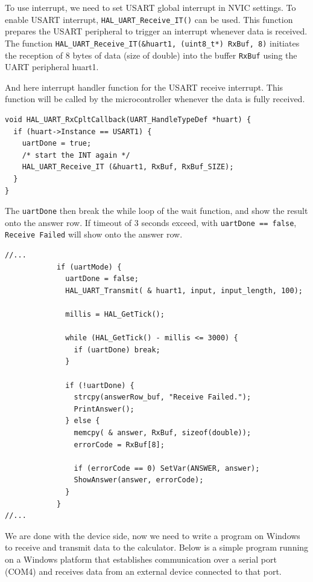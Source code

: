 \documentclass[a4paper, twoside]{report}
\begin{document}

To use interrupt, we need to set USART global interrupt in NVIC settings. To enable USART interrupt, \texttt{HAL\_UART\_Receive\_IT()} can be used. This function prepares the USART peripheral to trigger an interrupt whenever data is received. The function \texttt{HAL_UART_Receive_IT(&huart1, (uint8_t*) RxBuf, 8)} initiates the reception of 8 bytes of data (size of double) into the buffer \texttt{RxBuf} using the UART peripheral huart1.

And here interrupt handler function for the USART receive interrupt. This function will be called by the microcontroller whenever the data is fully received.

\begin{verbatim}
void HAL_UART_RxCpltCallback(UART_HandleTypeDef *huart) {
  if (huart->Instance == USART1) {
    uartDone = true;
    /* start the INT again */
    HAL_UART_Receive_IT (&huart1, RxBuf, RxBuf_SIZE);
  }
}
\end{verbatim}

The \texttt{uartDone} then break the while loop of the wait function, and show the result onto the answer row. If timeout of 3 seconds exceed, with \texttt{uartDone == false}, \texttt{Receive Failed} will show onto the answer row.

\begin{verbatim}
//...
            if (uartMode) {
              uartDone = false;
              HAL_UART_Transmit( & huart1, input, input_length, 100);

              millis = HAL_GetTick();

              while (HAL_GetTick() - millis <= 3000) {
                if (uartDone) break;
              }

              if (!uartDone) {
                strcpy(answerRow_buf, "Receive Failed.");
                PrintAnswer();
              } else {
                memcpy( & answer, RxBuf, sizeof(double));
                errorCode = RxBuf[8];

                if (errorCode == 0) SetVar(ANSWER, answer);
                ShowAnswer(answer, errorCode);
              }
            }
//...
\end{verbatim}

We are done with the device side, now we need to write a program on Windows to receive and transmit data to the calculator. Below is a simple program running on a Windows platform that establishes communication over a serial port (COM4) and receives data from an external device connected to that port.
\end{document}
